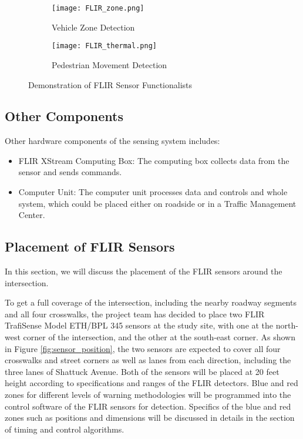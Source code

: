 \documentclass{article}
\begin{document}
\begin{figure}
    \centering
    \begin{subfigure}[b]{0.5\textwidth}
        \centering
        \texttt{[image: FLIR\_zone.png]}
        \caption{Vehicle Zone Detection}
        \label{fig:FLIR_zone}
    \end{subfigure}%
    \begin{subfigure}[b]{0.5\textwidth}
        \centering
        \texttt{[image: FLIR\_thermal.png]}
        \caption{Pedestrian Movement Detection}
        \label{fig:FLIR_thermal}
    \end{subfigure}
    \caption{Demonstration of FLIR Sensor Functionalists}
\end{figure}

\subsection{Other Components}
Other hardware components of the sensing system includes:
\begin{itemize}
    \item FLIR XStream Computing Box: The computing box collects data from the sensor and sends commands.
    \item Computer Unit: The computer unit processes data and controls and whole system, which could be placed either on roadside or in a Traffic Management Center.
\end{itemize}

\subsection{Placement of FLIR Sensors}
In this section, we will discuss the placement of the FLIR sensors around the intersection. 

To get a full coverage of the intersection, including the nearby roadway segments and all four crosswalks, the project team has decided to place two FLIR TrafiSense Model ETH/BPL 345 sensors at the study site, with one at the north-west corner of the intersection, and the other at the south-east corner. As shown in Figure \ref{fig:sensor_position}, the two sensors are expected to cover all four crosswalks and street corners as well as lanes from each direction, including the three lanes of Shattuck Avenue. Both of the sensors will be placed at 20 feet height according to specifications and ranges of the FLIR detectors. Blue and red zones for different levels of warning methodologies will be programmed into the control software of the FLIR sensors for detection. Specifics of the blue and red zones such as positions and dimensions will be discussed in details in the section of timing and control algorithms.
\end{document}
